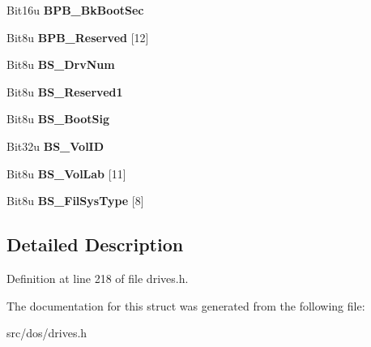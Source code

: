 \begin{DoxyCompactItemize}
\item 
\hypertarget{structFAT__BPB__MSDOS710__FAT32_aaf2a950448b46dd824f1d9c11daadc78}{Bit16u {\bfseries B\-P\-B\-\_\-\-Bk\-Boot\-Sec}}\label{structFAT__BPB__MSDOS710__FAT32_aaf2a950448b46dd824f1d9c11daadc78}

\item 
\hypertarget{structFAT__BPB__MSDOS710__FAT32_ac2018377cb75b56b3f0e7bc20371b353}{Bit8u {\bfseries B\-P\-B\-\_\-\-Reserved} \mbox{[}12\mbox{]}}\label{structFAT__BPB__MSDOS710__FAT32_ac2018377cb75b56b3f0e7bc20371b353}

\item 
\hypertarget{structFAT__BPB__MSDOS710__FAT32_acecd50a846c398eee6b2e2bc2ac0ac25}{Bit8u {\bfseries B\-S\-\_\-\-Drv\-Num}}\label{structFAT__BPB__MSDOS710__FAT32_acecd50a846c398eee6b2e2bc2ac0ac25}

\item 
\hypertarget{structFAT__BPB__MSDOS710__FAT32_a53c8a52382f5698723f8a48f897b7995}{Bit8u {\bfseries B\-S\-\_\-\-Reserved1}}\label{structFAT__BPB__MSDOS710__FAT32_a53c8a52382f5698723f8a48f897b7995}

\item 
\hypertarget{structFAT__BPB__MSDOS710__FAT32_a5c195dddaf006a46ebc25fe56d6beeec}{Bit8u {\bfseries B\-S\-\_\-\-Boot\-Sig}}\label{structFAT__BPB__MSDOS710__FAT32_a5c195dddaf006a46ebc25fe56d6beeec}

\item 
\hypertarget{structFAT__BPB__MSDOS710__FAT32_a926f1ac380cf4235ac29966430fbb155}{Bit32u {\bfseries B\-S\-\_\-\-Vol\-I\-D}}\label{structFAT__BPB__MSDOS710__FAT32_a926f1ac380cf4235ac29966430fbb155}

\item 
\hypertarget{structFAT__BPB__MSDOS710__FAT32_a85916fbd11565cc24585d7df960220f3}{Bit8u {\bfseries B\-S\-\_\-\-Vol\-Lab} \mbox{[}11\mbox{]}}\label{structFAT__BPB__MSDOS710__FAT32_a85916fbd11565cc24585d7df960220f3}

\item 
\hypertarget{structFAT__BPB__MSDOS710__FAT32_a7104bc3247381b3f3a0ec101e7cec3ab}{Bit8u {\bfseries B\-S\-\_\-\-Fil\-Sys\-Type} \mbox{[}8\mbox{]}}\label{structFAT__BPB__MSDOS710__FAT32_a7104bc3247381b3f3a0ec101e7cec3ab}

\end{DoxyCompactItemize}


\subsection{Detailed Description}


Definition at line 218 of file drives.\-h.



The documentation for this struct was generated from the following file\-:\begin{DoxyCompactItemize}
\item 
src/dos/drives.\-h\end{DoxyCompactItemize}
